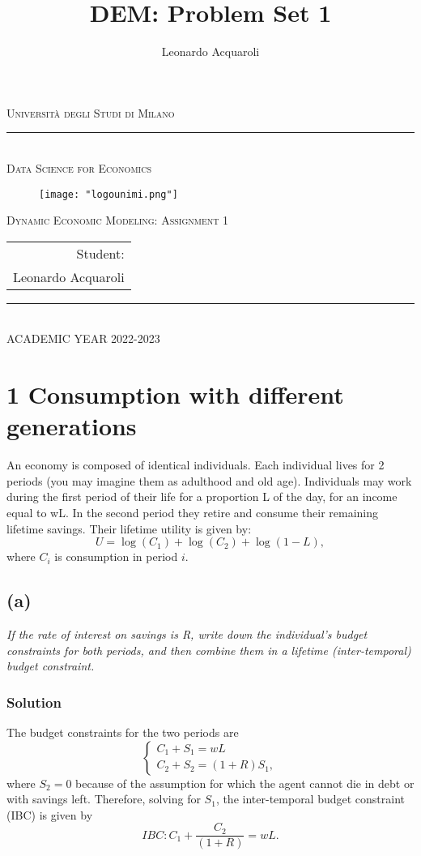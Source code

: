 \documentclass[a4paper,10pt]{report}
\begin{document}
	\author{Leonardo Acquaroli}
	\title{DEM: Problem Set 1}
	\thispagestyle{empty}
	
	
	\begin{center}
		\Large
		\textsc{Università degli Studi di Milano}\\
		\vspace{-0.4cm}
		\rule{\textwidth}{0.1mm}\\
		\large
		\textsc{Data Science for Economics}\\ 
		\begin{figure}[H]
			\centering
			\texttt{[image: "logounimi.png"]}
			\label{fig:unimi}
		\end{figure}
		\vfill
		\Large
		\textsc{Dynamic Economic Modeling: Assignment 1}
	\end{center}
	\vfill
	
	\hfill
	\begin{tabular}[t]{r}
		Student:\\
		Leonardo Acquaroli\\
	\end{tabular}
	\vfill
	\begin{center}
		\normalsize
		\rule{8cm}{0.1mm}\\
		\bigskip
		ACADEMIC YEAR 2022-2023
	\end{center}

\chapter*{1 Consumption with different generations}
An economy is composed of identical individuals. Each individual lives for 2 periods (you may imagine them as adulthood and old age). Individuals may work during the first period of their life for a proportion L of the day, for an income equal to wL. In the second period they retire and consume their remaining lifetime savings. Their lifetime utility is given by:
\begin{equation}\label{utility}
U = \log(C_1) + \log(C_2) + \log(1-L),
\end{equation}
where $ C_i $ is consumption in period $ i $.
\section*{(a)}
\textit{If the rate of interest on savings is R, write down the individual's budget constraints for both periods, and then combine them in a lifetime (inter-temporal) budget constraint.}
\subsection*{Solution}
The budget constraints for the two periods are
\[\begin{cases}
	C_1 + S_1 = wL \\
	C_2 + S_2 = (1+R)S_1,
\end{cases}
\]
where $ S_2 = 0 $ because of the assumption for which the agent cannot die in debt or with savings left.
Therefore, solving for $ S_1 $, the inter-temporal budget constraint (IBC) is given by
\begin{equation}\label{IBC_1}
	IBC: C_1 + \frac{C_2}{(1+R)} = wL.
\end{equation}
\end{document}
